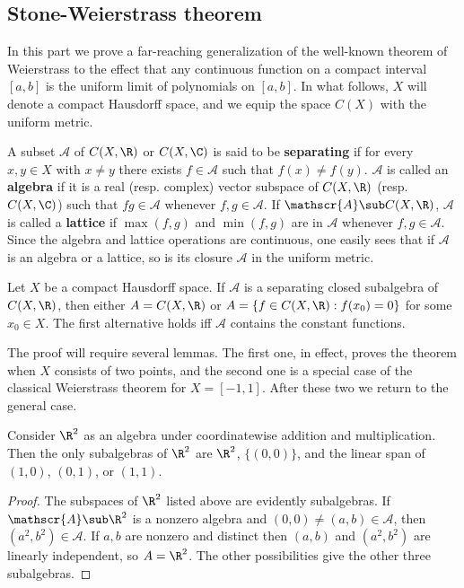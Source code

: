 \subsection{Stone-Weierstrass theorem}
In this part we prove a far-reaching generalization of the well-known theorem of Weierstrass to the effect that any continuous function on a compact interval $[a,b]$ is the uniform limit of polynomials on $[a,b]$. In what follows, $X$ will denote a compact Hausdorff space, and we equip the space $C(X)$ with the uniform metric.\par
A subset $\mathscr{A}$ of $C(X,\R)$ or $C(X,\C)$ is said to be \textbf{separating} if for every $x,y\in X$ with $x\neq y$ there exists $f\in\mathscr{A}$ such that $f(x)\neq f(y)$. $\mathscr{A}$ is called an \textbf{algebra} if it is a real (resp. complex) vector subspace of $C(X,\R)$ (resp. $C(X,\C)$) such that $fg\in\mathscr{A}$ whenever $f,g\in\mathscr{A}$. If $\mathscr{A}\sub C(X,\R)$, $\mathscr{A}$ is called a \textbf{lattice} if $\max(f,g)$ and $\min(f,g)$ are in $\mathscr{A}$ whenever $f,g\in\mathscr{A}$. Since the algebra and lattice operations are continuous, one easily sees that if $\mathscr{A}$ is an algebra or a lattice, so is its closure $\mathscr{A}$ in the uniform metric.
\begin{theorem}\label{Stone-Weierstrass}
Let $X$ be a compact Hausdorff space. If $\mathscr{A}$ is a separating closed subalgebra of $C(X,\R)$, then either $A=C(X,\R)$ or $A=\{f\in C(X,\R):f(x_0)=0\}$ for some $x_0\in X$. The first alternative holds iff $\mathscr{A}$ contains the constant functions.
\end{theorem}
The proof will require several lemmas. The first one, in effect, proves the theorem when $X$ consists of two points, and the second one is a special case of the classical Weierstrass theorem for $X=[-1,1]$. After these two we return to the general case.
\begin{lemma}\label{Stone-Weierstrass subalgebra of R^2}
Consider $\R^2$ as an algebra under coordinatewise addition and multiplication. Then the only subalgebras of $\R^2$ are $\R^2$, $\{(0,0)\}$, and the linear span of $(1,0)$, $(0,1)$, or $(1,1)$.
\end{lemma}
\begin{proof}
The subspaces of $\R^2$ listed above are evidently subalgebras. If $\mathscr{A}\sub\R^2$ is a nonzero algebra and $(0,0)\neq(a,b)\in\mathscr{A}$, then $(a^2,b^2)\in\mathscr{A}$. If $a,b$ are nonzero and distinct then $(a,b)$ and $(a^2,b^2)$ are linearly independent, so $A=\R^2$. The other possibilities give the other three subalgebras.
\end{proof}
